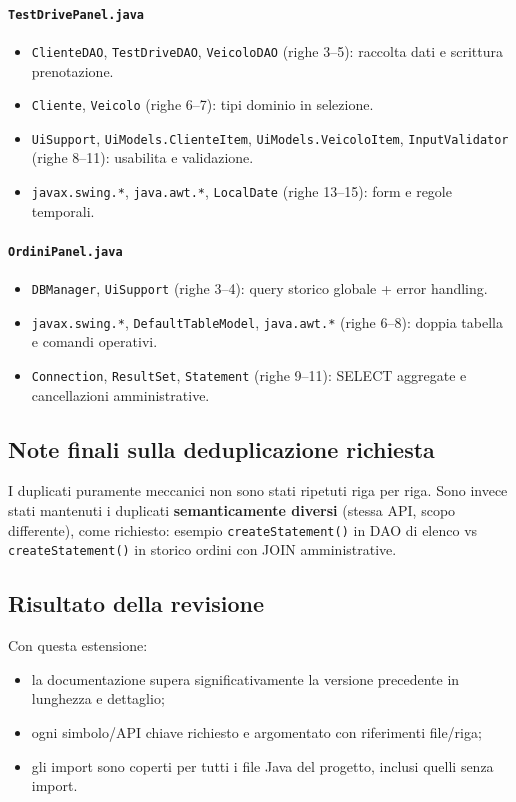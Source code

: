 \documentclass[12pt,a4paper]{article}
\begin{document}
\paragraph{\texttt{TestDrivePanel.java}}
\begin{itemize}
  \item \texttt{ClienteDAO}, \texttt{TestDriveDAO}, \texttt{VeicoloDAO} (righe 3--5): raccolta dati e scrittura prenotazione.
  \item \texttt{Cliente}, \texttt{Veicolo} (righe 6--7): tipi dominio in selezione.
  \item \texttt{UiSupport}, \texttt{UiModels.ClienteItem}, \texttt{UiModels.VeicoloItem}, \texttt{InputValidator} (righe 8--11): usabilita e validazione.
  \item \texttt{javax.swing.*}, \texttt{java.awt.*}, \texttt{LocalDate} (righe 13--15): form e regole temporali.
\end{itemize}

\paragraph{\texttt{OrdiniPanel.java}}
\begin{itemize}
  \item \texttt{DBManager}, \texttt{UiSupport} (righe 3--4): query storico globale + error handling.
  \item \texttt{javax.swing.*}, \texttt{DefaultTableModel}, \texttt{java.awt.*} (righe 6--8): doppia tabella e comandi operativi.
  \item \texttt{Connection}, \texttt{ResultSet}, \texttt{Statement} (righe 9--11): SELECT aggregate e cancellazioni amministrative.
\end{itemize}

\subsection{Note finali sulla deduplicazione richiesta}
I duplicati puramente meccanici non sono stati ripetuti riga per riga.
Sono invece stati mantenuti i duplicati \textbf{semanticamente diversi} (stessa API, scopo differente),
come richiesto: esempio \texttt{createStatement()} in DAO di elenco vs \texttt{createStatement()} in storico ordini con JOIN amministrative.

\subsection{Risultato della revisione}
Con questa estensione:
\begin{itemize}
  \item la documentazione supera significativamente la versione precedente in lunghezza e dettaglio;
  \item ogni simbolo/API chiave richiesto e argomentato con riferimenti file/riga;
  \item gli import sono coperti per tutti i file Java del progetto, inclusi quelli senza import.
\end{itemize}
\end{document}
